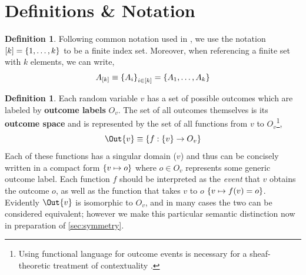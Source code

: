 \documentclass[aps, 10pt, english, twoside, pra, nofootinbib, longbibliography]{revtex4-1}
\theoremstyle{plain}
\theoremstyle{definition}
\newtheorem{definition}[theorem]{Definition}
\theoremstyle{remark}
\newcommand{\term}[1]{\textcolor{Mahogany}{\textbf{#1}}}
\begin{document}
    \section{Definitions \& Notation}
    \begin{definition}
        Following common notation used in \cite{Fritz_2011}, we use the notation $\bs{k} = \bc{1, \ldots, k}$ to be a finite index set. Moreover, when referencing a finite set with $k$ elements, we can write,
        \[ A_{\bs{k}} \defined \bc{A_i}_{i \in \bs{k}} = \bc{A_1, \ldots, A_k} \]
    \end{definition}
    \begin{definition}
        \label{def:outcome_space}
        Each random variable $v$ has a set of possible outcomes which are labeled by \term{outcome labels} $O_v$. The set of all outcomes themselves is its \term{outcome space} and is represented by the set of all functions from $v$ to $O_v$\footnote{Using functional language for outcome events is necessary for a sheaf-theoretic treatment of contextuality \cite{Abramsky_2011}.},
        \[ \Out{v} \defined \bc{f : \bc{v} \to O_v} \]
        Each of these functions has a singular domain ($v$) and thus can be concisely written in a compact form $\bc{v \mapsto o}$ where $o \in O_v$ represents some generic outcome label. Each function $f$ should be interpreted as the \textit{event} that $v$ obtains the outcome $o$, as well as the function that takes $v$ to $o$ $\bc{v \mapsto f\br{v} = o}$. Evidently $\Out{v}$ is isomorphic to $O_v$, and in many cases the two can be considered equivalent; however we make this particular semantic distinction now in preparation of \cref{sec:symmetry}.
    \end{definition}
\end{document}
